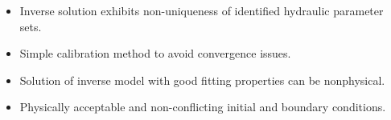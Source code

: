 \documentclass[a4paper,10pt]{report}
\begin{document}
% 


\begin{itemize}
 \item Inverse solution exhibits non-uniqueness  of identified hydraulic parameter sets.
 \item Simple calibration method to avoid convergence issues.
 \item Solution of inverse model with good fitting properties can be nonphysical.
 \item Physically acceptable and non-conflicting initial and boundary conditions. 
\end{itemize}
\end{document}
